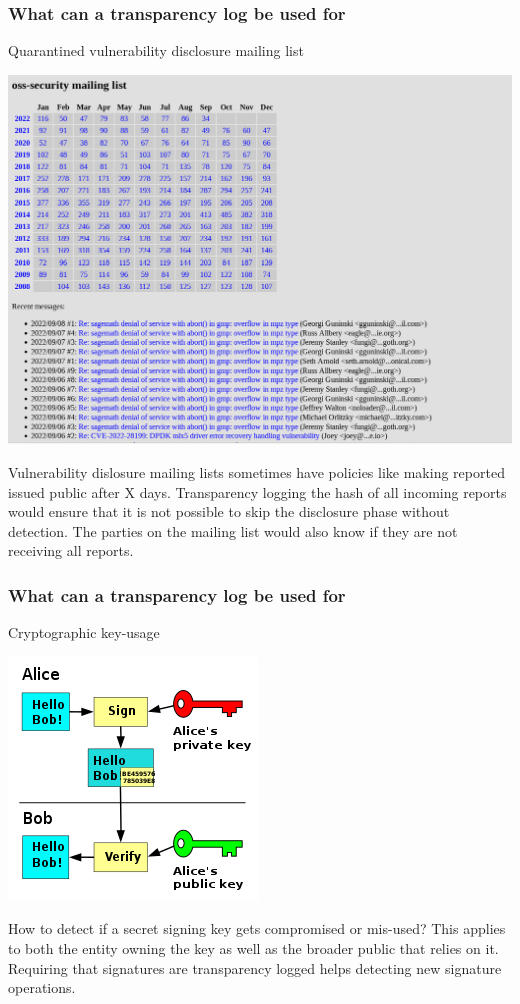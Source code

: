 \begin{frame}
  \frametitle{What can a transparency log be used for}

  \centerline{Quarantined vulnerability disclosure mailing list}

  \centerline{\includegraphics[scale=.1]{img/oss-security}}
  \pause

  Vulnerability dislosure mailing lists sometimes have policies like
  making reported issued public after X days. Transparency logging the
  hash of all incoming reports would ensure that it is not possible to
  skip the disclosure phase without detection. The parties on the
  mailing list would also know if they are not receiving all reports.
\end{frame}

\begin{frame}
  \frametitle{What can a transparency log be used for}

  \centerline{Cryptographic key-usage}

  \centerline{\includegraphics[scale=.3]{img/signing-key}}
  \pause

  How to detect if a secret signing key gets compromised or mis-used?
  This applies to both the entity owning the key as well as the
  broader public that relies on it. Requiring that signatures are
  transparency logged helps detecting new signature operations.
\end{frame}

